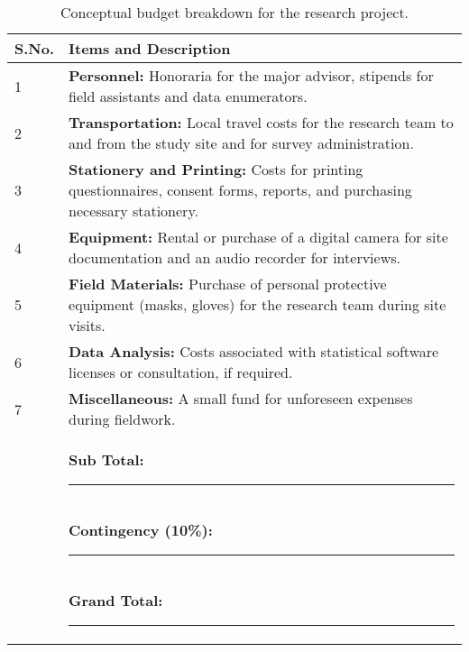 \begin{table}[H]
    \centering
    \caption{Conceptual budget breakdown for the research project.}
    \label{tab:budget}
    \begin{tabularx}{\textwidth}{@{}lX@{}}
    \toprule
    \textbf{S.No.} & \textbf{Items and Description} \\ \midrule
    1 & \textbf{Personnel:} Honoraria for the major advisor, stipends for field assistants and data enumerators. \\
    2 & \textbf{Transportation:} Local travel costs for the research team to and from the study site and for survey administration. \\
    3 & \textbf{Stationery and Printing:} Costs for printing questionnaires, consent forms, reports, and purchasing necessary stationery. \\
    4 & \textbf{Equipment:} Rental or purchase of a digital camera for site documentation and an audio recorder for interviews. \\
    5 & \textbf{Field Materials:} Purchase of personal protective equipment (masks, gloves) for the research team during site visits. \\
    6 & \textbf{Data Analysis:} Costs associated with statistical software licenses or consultation, if required. \\
    7 & \textbf{Miscellaneous:} A small fund for unforeseen expenses during fieldwork. \\ \midrule
    & \textbf{Sub Total:} \rule{0.25\linewidth}{0.4pt} \\
    & \textbf{Contingency (10\%):} \rule{0.25\linewidth}{0.4pt} \\
    & \textbf{Grand Total:} \rule{0.25\linewidth}{0.4pt} \\ \bottomrule
    \end{tabularx}
\end{table}

